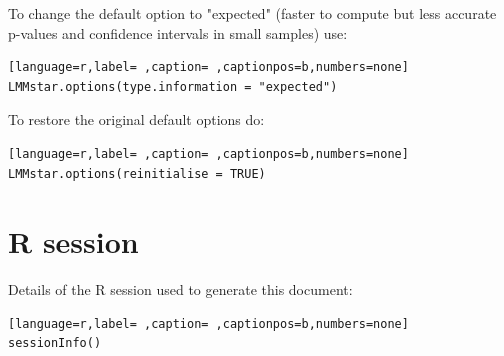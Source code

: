 \documentclass[12pt]{article}
\begin{document}
To change the default option to "expected" (faster to compute but less accurate p-values and confidence intervals in small samples) use:
\begin{lstlisting}[language=r,label= ,caption= ,captionpos=b,numbers=none]
LMMstar.options(type.information = "expected")
\end{lstlisting}

To restore the original default options do:
\begin{lstlisting}[language=r,label= ,caption= ,captionpos=b,numbers=none]
LMMstar.options(reinitialise = TRUE)
\end{lstlisting}

\clearpage

\section{R session}
\label{sec:orgabba7fd}
Details of the R session used to generate this document:
\begin{lstlisting}[language=r,label= ,caption= ,captionpos=b,numbers=none]
sessionInfo()
\end{lstlisting}
\end{document}
